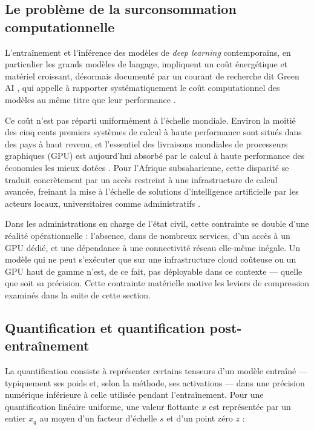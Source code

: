\subsection{Le problème de la surconsommation computationnelle}
\label{sec:surconsommation}

L'entraînement et l'inférence des modèles de \textit{deep learning} contemporains, en particulier les grands modèles de langage, impliquent un coût énergétique et matériel croissant, désormais documenté par un courant de recherche dit \og Green AI \fg{}, qui appelle à rapporter systématiquement le coût computationnel des modèles au même titre que leur performance \cite{schwartz2020greenai,strubell2019energy}.

Ce coût n'est pas réparti uniformément à l'échelle mondiale.
Environ la moitié des cinq cents premiers systèmes de calcul à haute performance sont situés dans des pays à haut revenu, et l'essentiel des livraisons mondiales de processeurs graphiques (GPU) est aujourd'hui absorbé par le calcul à haute performance des économies les mieux dotées \cite{isocpulse2024fractures}.
Pour l'Afrique subsaharienne, cette disparité se traduit concrètement par un accès restreint à une infrastructure de calcul avancée, freinant la mise à l'échelle de solutions d'intelligence artificielle par les acteurs locaux, universitaires comme administratifs \cite{idrc2024computeinitiative}.

Dans les administrations en charge de l'état civil, cette contrainte se double d'une réalité opérationnelle : l'absence, dans de nombreux services, d'un accès à un GPU dédié, et une dépendance à une connectivité réseau elle-même inégale. Un modèle qui ne peut s'exécuter que sur une infrastructure cloud coûteuse ou un GPU haut de gamme n'est, de ce fait, pas déployable dans ce contexte --- quelle que soit sa précision. Cette contrainte matérielle motive les leviers de compression examinés dans la suite de cette section.

\subsection{Quantification et quantification post-entraînement}
\label{sec:quantification}

La quantification consiste à représenter certains tenseurs d'un modèle entraîné --- typiquement ses poids et, selon la méthode, ses activations --- dans une précision numérique inférieure à celle utilisée pendant l'entraînement. Pour une quantification linéaire uniforme, une valeur flottante $x$ est représentée par un entier $x_q$ au moyen d'un facteur d'échelle $s$ et d'un point zéro $z$ :

